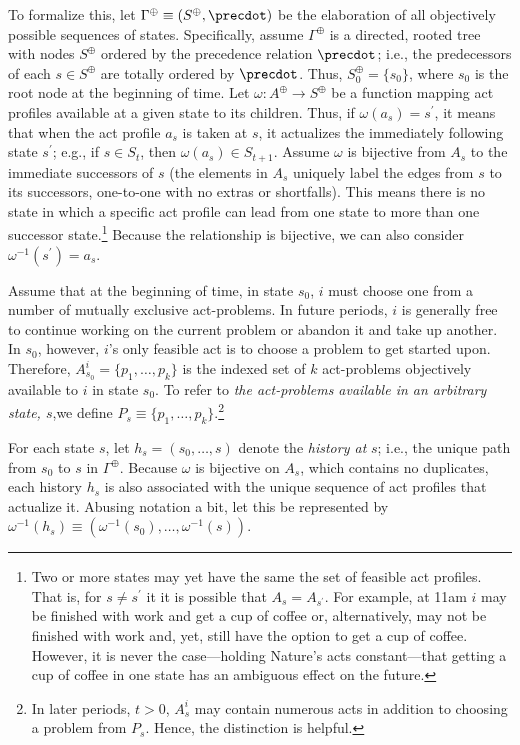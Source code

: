 \documentclass[
11pt,
titlepage,
reqno,
]{article}%
\theoremstyle{definition}
\begin{document}
To formalize this,  let $\Gamma^\oplus\equiv( S^\oplus,\precdot)$ be the elaboration of all objectively possible sequences of states.
Specifically, assume $\Gamma^\oplus$ is a directed, rooted tree with nodes $S^\oplus$ ordered by the precedence relation $\precdot$; i.e., the predecessors of each $s\in S^\oplus$ are totally ordered by $\precdot$. 
Thus, $S^\oplus_0=\{s_0\}$, where $s_0$ is the root node at the beginning of time.
Let $\omega:A^\oplus\rightarrow S^\oplus$ be a function mapping act profiles available at a given state to its children.	
Thus, if $\omega(a_s)=s^\prime$, it means that when the act profile $a_s$ is taken at $s$, it actualizes the immediately following state $s^\prime$; e.g., if $s\in S_t$, then $\omega(a_s)\in S_{t+1}$.
Assume $\omega$ is bijective from $A_s$ to the immediate successors of $s$ (the elements in $A_s$ uniquely label the edges from $s$ to its successors, one-to-one with no extras or shortfalls).
This means there is no state in which a specific act profile can lead from one state to more than one successor state.\footnote
{ 
	Two or more states may yet have the same the set of feasible act profiles. That is, for $s\ne s^\prime$ it it is possible that $A_s=A_{s^\prime}$. For example, at 11am $i$ may be finished with  work and get a cup of coffee or, alternatively, may not be finished with work and, yet, still have the option to get a cup of coffee. However, it is never the case---holding Nature's acts constant---that getting a cup of coffee in one state has an ambiguous effect on the future.
}
Because the relationship is bijective, we can also consider $\omega^{-1}(s^\prime)=a_s$.

Assume that at the beginning of time, in state $s_0$, $i$ must choose one from  a number of mutually exclusive act-problems.
In future periods, $i$ is generally free to continue working on the current problem or abandon it and take up another. 
In $s_0$, however, $i$'s only feasible act is to choose a problem to get started upon. 
Therefore, $A^i_{s_0}=\{p_1,\ldots,p_k\}$ is the indexed set of $k$ act-problems objectively available to $i$ in state $s_0$.
To refer to \textit{the act-problems available in an arbitrary state, $s$},we define $P_s\equiv \{p_1,\ldots,p_k\}$.\footnote
{
	In later periods, $t>0$, $A^i_s$ may contain numerous acts in addition to choosing a problem from $P_s$. Hence, the distinction is helpful.
}
	
For each state $s$, let $h_s=(s_0,\ldots,s)$ denote the \textit{history at} $s$; i.e., the unique path from $s_0$ to $s$ in $\Gamma^\oplus$.
Because $\omega$ is bijective on $A_s$, which contains no duplicates, each history $h_s$ is also associated with the unique sequence of act profiles that actualize it.
Abusing notation a bit, let this be represented by  $\omega^{-1}(h_s)\equiv(\omega^{-1}(s_0),\ldots,\omega^{-1}(s))$.
\end{document}
